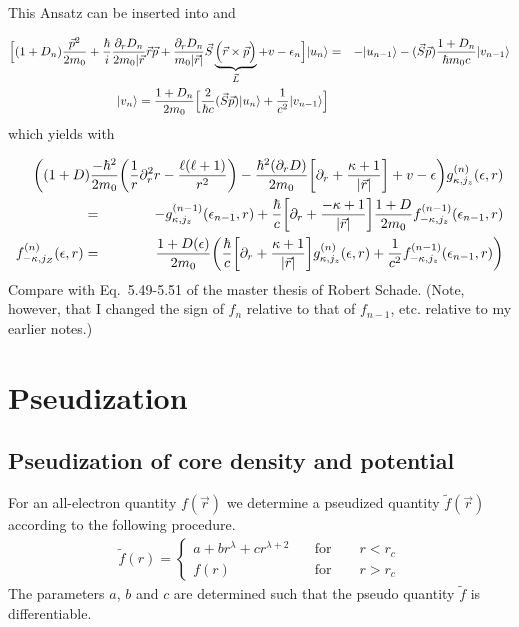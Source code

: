 \documentclass[11pt,a4paper]{report}
\begin{document}
This Ansatz can be inserted into 
and 


\begin{eqnarray}
\Bigl[
(1+D_n)\frac{\vec{p}^2}{2m_0}
+\frac{\hbar}{i}
\frac{\partial_rD_n}{2m_0|\vec{r}}\vec{r}\vec{p}
+\frac{\partial_rD_n}{m_0|\vec{r}|} \vec{S}\underbrace{
\Bigl(\vec{r}\times\vec{p}\Bigr)}_{\vec{L}}
+v-\epsilon_n\Bigr]|u_n\rangle
&=&-|u_{n-1}\rangle -(\vec{S}\vec{p})\frac{1+D_n}{\hbar m_0c}|v_{n-1}\rangle
\nonumber\\
|v_n\rangle=\frac{1+D_n}{2 m_0}
\Bigl[\frac{2}{\hbar c}
(\vec{S}\vec{p})|u_n\rangle
+\frac{1}{c^2}|v_{n-1}\rangle\Bigr]
\end{eqnarray}
which yields with 

\begin{eqnarray}
&&\hspace{-2cm}\biggl(
(1+D)\frac{-\hbar^2}{2m_0}\biggl(\frac{1}{r}\partial_r^2r
-\frac{\ell(\ell+1)}{r^2}\biggr)
-\frac{\hbar^2(\partial_r D)}{2m_0}
\biggl[\partial_r
+\frac{\kappa+1}{|\vec{r}|}\biggr]
+v-\epsilon \biggr)g^{(n)}_{\kappa,j_z}(\epsilon,r)
\nonumber\\
&=&
-g^{(n-1)}_{\kappa,j_z}(\epsilon_{n-1},r)
+
\frac{\hbar}{c}\biggl[\partial_r+\frac{-\kappa+1}{|\vec{r}|}\biggr]
\frac{1+D}{ 2m_0 }
f_{-\kappa,j_z}^{(n-1)}(\epsilon_{n-1},r)
\nonumber\\
f_{-\kappa,j_Z}^{(n)}(\epsilon,r)
&=&\frac{1+D(\epsilon)}{2 m_0}
\biggl(\frac{\hbar}{c}\biggl[\partial_r+\frac{\kappa+1}{|\vec{r}|}\biggr]
g_{\kappa,j_z}^{(n)}(\epsilon,r)
+
\frac{1}{c^2}f_{-\kappa,j_z}^{(n-1)}(\epsilon_{n-1},r)\biggr)
\end{eqnarray}
Compare with Eq.~5.49-5.51 of the master thesis of Robert
Schade\cite{schade12_thesis}.  (Note, however, that I changed the sign
of $f_{n}$ relative to that of $f_{n-1}$, etc. relative to my earlier
notes.)

\section{Pseudization}
\label{sec:pseudiation}
\subsection{Pseudization of core density and potential}
For an all-electron quantity $f(\vec{r})$ we determine a pseudized
quantity $\tilde{f}(\vec{r})$ according to the following procedure.
\begin{eqnarray*}
\tilde{f}(r)=
\left\lbrace\begin{array}{ll}
a+br^\lambda+cr^{\lambda+2}&\quad\textrm{for}\qquad r<r_c\\
f(r)&\quad\textrm{for}\qquad r>r_c
\end{array}
\right.
\end{eqnarray*}
The parameters $a$, $b$ and $c$ are determined such that the pseudo
quantity $\tilde{f}$ is differentiable.
\end{document}
